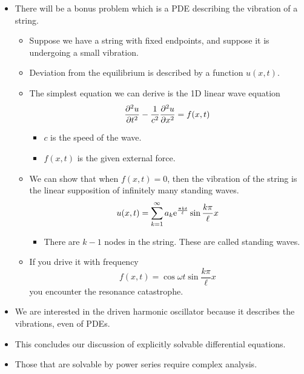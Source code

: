 \documentclass[../notes.tex]{subfiles}
\begin{document}
\begin{itemize}
\begin{itemize}
\begin{itemize}
        \end{itemize}
    \end{itemize}
    \item There will be a bonus problem which is a PDE describing the vibration of a string.
    \begin{itemize}
        \item Suppose we have a string with fixed endpoints, and suppose it is undergoing a small vibration.
        \item Deviation from the equilibrium is described by a function $u(x,t)$.
        \item The simplest equation we can derive is the 1D linear wave equation
        \begin{equation*}
            \pdv[2]{u}{t}-\frac{1}{c^2}\pdv[2]{u}{x} = f(x,t)
        \end{equation*}
        \begin{itemize}
            \item $c$ is the speed of the wave.
            \item $f(x,t)$ is the given external force.
        \end{itemize}
        \item We can show that when $f(x,t)=0$, then the vibration of the string is the linear supposition of infinitely many standing waves.
        \begin{equation*}
            u(x,t) = \sum_{k=1}^\infty a_k\e[\frac{\pi kt}{\ell}]\sin\frac{k\pi}{\ell}x
        \end{equation*}
        \begin{itemize}
            \item There are $k-1$ nodes in the string. These are called standing waves.
        \end{itemize}
        \item If you drive it with frequency
        \begin{equation*}
            f(x,t) = \cos\omega t\sin\frac{k\pi}{\ell}x
        \end{equation*}
        you encounter the resonance catastrophe.
    \end{itemize}
    \item We are interested in the driven harmonic oscillator because it describes the vibrations, even of PDEs.
    \item This concludes our discussion of explicitly solvable differential equations.
    \item Those that are solvable by power series require complex analysis.

\end{itemize}
\end{document}
